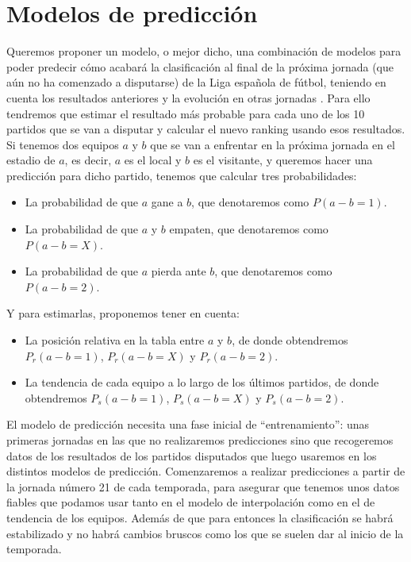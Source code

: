 \chapter{Modelos de predicción}
Queremos proponer un modelo, o mejor dicho, una combinación de modelos para poder predecir cómo acabará la clasificación al final de la próxima jornada (que aún no ha comenzado a disputarse) de la Liga española de fútbol, teniendo en cuenta los resultados anteriores y la evolución en otras jornadas \cite{tfgjavi}. Para ello tendremos que estimar el resultado más probable para cada uno de los 10 partidos que se van a disputar y calcular el nuevo ranking usando esos resultados. \\

Si tenemos dos equipos $a$ y $b$ que se van a enfrentar en la próxima jornada en el estadio de $a$, es decir, $a$ es el local y $b$ es el visitante, y queremos hacer una predicción para dicho partido, tenemos que calcular tres probabilidades:
\begin{itemize}
	\item La probabilidad de que $a$ gane a $b$, que denotaremos como $P(a-b=1)$.
	\item La probabilidad de que $a$ y $b$ empaten, que denotaremos como $P(a-b=X)$.
	\item La probabilidad de que $a$ pierda ante $b$, que denotaremos como $P(a-b=2)$.
\end{itemize}
Y para estimarlas, proponemos tener en cuenta:
\begin{itemize}
	\item La posición relativa en la tabla entre $a$ y $b$, de donde obtendremos $P_{r}(a-b=1)$, $P_{r}(a-b=X)$ y $P_{r}(a-b=2)$.
	\item La tendencia de cada equipo a lo largo de los últimos partidos, de donde obtendremos $P_{s}(a-b=1)$, $P_{s}(a-b=X)$ y $P_{s}(a-b=2)$.
\end{itemize}

El modelo de predicción necesita una fase inicial de ``entrenamiento'': unas primeras jornadas en las que no realizaremos predicciones sino que recogeremos datos de los resultados de los partidos disputados que luego usaremos en los distintos modelos de predicción. Comenzaremos a realizar predicciones a partir de la jornada número 21 de cada temporada, para asegurar que tenemos unos datos fiables que podamos usar tanto en el modelo de interpolación como en el de tendencia de los equipos. Además de que para entonces la clasificación se habrá estabilizado y no habrá cambios bruscos como los que se suelen dar al inicio de la temporada.

